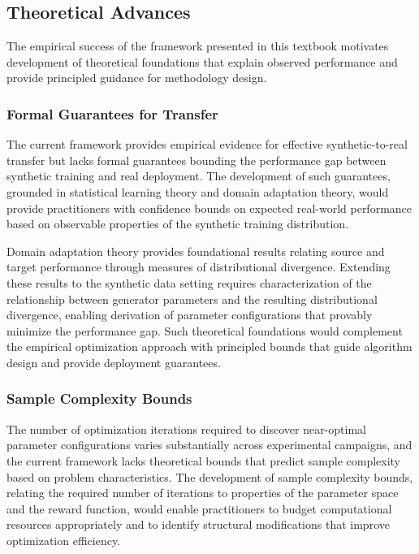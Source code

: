 \subsection{Theoretical Advances}
\label{subsec:theoretical_advances}

The empirical success of the framework presented in this textbook motivates development of theoretical foundations that explain observed performance and provide principled guidance for methodology design.

\subsubsection{Formal Guarantees for Transfer}
\label{subsubsec:formal_guarantees}

The current framework provides empirical evidence for effective synthetic-to-real transfer but lacks formal guarantees bounding the performance gap between synthetic training and real deployment. The development of such guarantees, grounded in statistical learning theory and domain adaptation theory, would provide practitioners with confidence bounds on expected real-world performance based on observable properties of the synthetic training distribution.

Domain adaptation theory provides foundational results relating source and target performance through measures of distributional divergence. Extending these results to the synthetic data setting requires characterization of the relationship between generator parameters and the resulting distributional divergence, enabling derivation of parameter configurations that provably minimize the performance gap. Such theoretical foundations would complement the empirical optimization approach with principled bounds that guide algorithm design and provide deployment guarantees.

\subsubsection{Sample Complexity Bounds}
\label{subsubsec:sample_complexity}

The number of optimization iterations required to discover near-optimal parameter configurations varies substantially across experimental campaigns, and the current framework lacks theoretical bounds that predict sample complexity based on problem characteristics. The development of sample complexity bounds, relating the required number of iterations to properties of the parameter space and the reward function, would enable practitioners to budget computational resources appropriately and to identify structural modifications that improve optimization efficiency.

